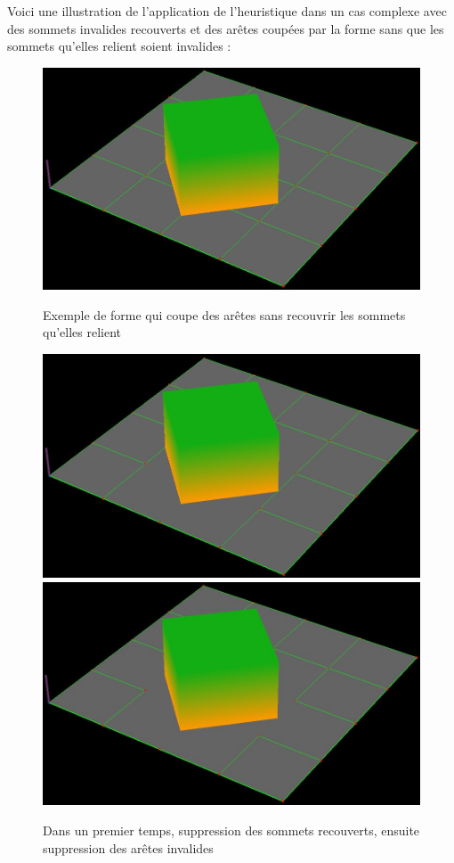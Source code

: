 \documentclass[a4paper,12pt]{report}
\begin{document}
Voici une illustration de l'application de l'heuristique dans un cas complexe avec des sommets invalides recouverts et des arêtes coupées par la forme sans que les sommets qu'elles relient soient invalides : 

\begin{figure}[h]
\centering
\includegraphics[scale=0.25]{Images/1-maillage.jpg}
\caption{Exemple de forme qui coupe des arêtes sans recouvrir les sommets qu'elles relient}
\includegraphics[scale=0.23]{Images/2-SuppressionSommet.jpg}
\includegraphics[scale=0.23]{Images/3-SuppressionAretes.jpg}
\caption{Dans un premier temps, suppression des sommets recouverts, ensuite suppression des arêtes invalides}
\end{figure}
\vspace{0.5cm}
\end{document}
